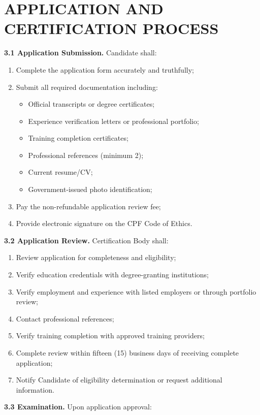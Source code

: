 \documentclass[11pt,a4paper]{article}
\begin{document}
\section{APPLICATION AND CERTIFICATION PROCESS}

\textbf{3.1 Application Submission.} Candidate shall:

\begin{enumerate}[label=\alph*)]
\item Complete the application form accurately and truthfully;
\item Submit all required documentation including:
\begin{itemize}
\item Official transcripts or degree certificates;
\item Experience verification letters or professional portfolio;
\item Training completion certificates;
\item Professional references (minimum 2);
\item Current resume/CV;
\item Government-issued photo identification;
\end{itemize}
\item Pay the non-refundable application review fee;
\item Provide electronic signature on the CPF Code of Ethics.
\end{enumerate}

\textbf{3.2 Application Review.} Certification Body shall:

\begin{enumerate}[label=\alph*)]
\item Review application for completeness and eligibility;
\item Verify education credentials with degree-granting institutions;
\item Verify employment and experience with listed employers or through portfolio review;
\item Contact professional references;
\item Verify training completion with approved training providers;
\item Complete review within fifteen (15) business days of receiving complete application;
\item Notify Candidate of eligibility determination or request additional information.
\end{enumerate}

\textbf{3.3 Examination.} Upon application approval:
\end{document}
